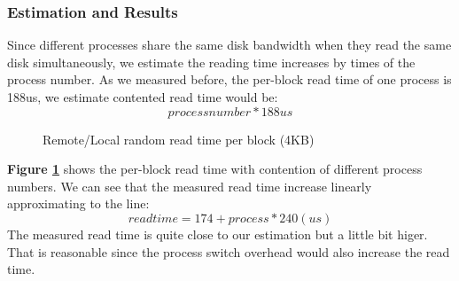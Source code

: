 \subsubsection{Estimation and Results}
Since different processes share the same disk bandwidth when they read the same disk simultaneously, we estimate the reading time increases by times of the process number. As we measured before, the per-block read time of one process is 188us, we estimate contented read time would be:
$$process number * 188us$$

\begin{figure}[ht]
    \centering
    \caption{Remote/Local random read time per block (4KB)}
    \label{contention_read_time}
\end{figure}

\textbf{Figure \ref{contention_read_time}} shows the per-block read time with contention of different process numbers. We can see that the measured read time increase linearly approximating to the line:
$$ read time = 174 + process * 240 (us)$$
The measured read time is quite close to our estimation but a little bit higer. That is reasonable since the process switch overhead would also increase the read time.
